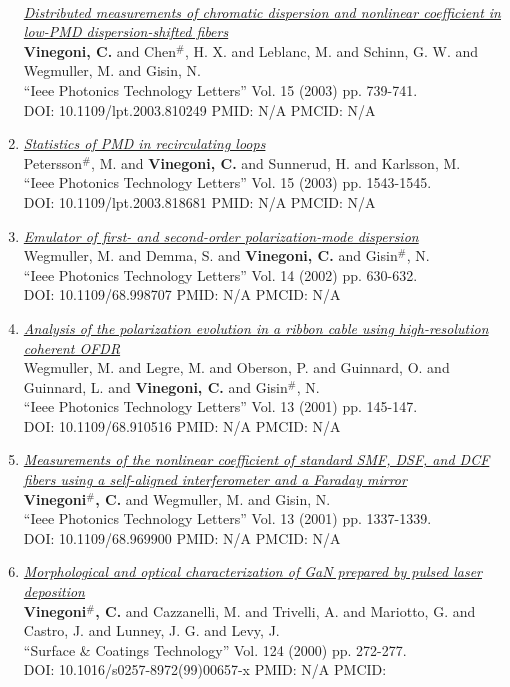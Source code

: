 \documentclass{resume}
\begin{document}
\begin{category}{~~}
\begin{enumerate}
\href{https://cvinegoni.github.io/assets/pdf/papers/2003-PTL-2.pdf}{\it  Distributed measurements of chromatic dispersion and nonlinear coefficient in low-PMD dispersion-shifted fibers} \\ {\bf Vinegoni, C.} and Chen$^\#$, H. X. and Leblanc, M. and Schinn, G. W. and Wegmuller, M. and Gisin, N. \\ ``Ieee Photonics Technology Letters'' Vol. 15 (2003) pp. 739-741. \\ DOI: 10.1109/lpt.2003.810249 PMID: N/A PMCID: N/A\item \href{https://cvinegoni.github.io/assets/pdf/papers/2003-PTL-1.pdf}{\it  Statistics of PMD in recirculating loops} \\ Petersson$^\#$, M. and {\bf Vinegoni, C.} and Sunnerud, H. and Karlsson, M. \\ ``Ieee Photonics Technology Letters'' Vol. 15 (2003) pp. 1543-1545. \\ DOI: 10.1109/lpt.2003.818681 PMID: N/A PMCID: N/A\item \href{https://cvinegoni.github.io/assets/pdf/papers/2002-PTL.pdf}{\it  Emulator of first- and second-order polarization-mode dispersion} \\ Wegmuller, M. and Demma, S. and {\bf Vinegoni, C.} and Gisin$^\#$, N. \\ ``Ieee Photonics Technology Letters'' Vol. 14 (2002) pp. 630-632. \\ DOI: 10.1109/68.998707 PMID: N/A PMCID: N/A\item \href{https://cvinegoni.github.io/assets/pdf/papers/2001-PTL-2.pdf}{\it  Analysis of the polarization evolution in a ribbon cable using high-resolution coherent OFDR} \\ Wegmuller, M. and Legre, M. and Oberson, P. and Guinnard, O. and Guinnard, L. and {\bf Vinegoni, C.} and Gisin$^\#$, N. \\ ``Ieee Photonics Technology Letters'' Vol. 13 (2001) pp. 145-147. \\ DOI: 10.1109/68.910516 PMID: N/A PMCID: N/A\item \href{https://cvinegoni.github.io/assets/pdf/papers/2001-PTL-1.pdf}{\it  Measurements of the nonlinear coefficient of standard SMF, DSF, and DCF fibers using a self-aligned interferometer and a Faraday mirror} \\ {\bf Vinegoni$^\#$, C.} and Wegmuller, M. and Gisin, N. \\ ``Ieee Photonics Technology Letters'' Vol. 13 (2001) pp. 1337-1339. \\ DOI: 10.1109/68.969900 PMID: N/A PMCID: N/A\item \href{https://cvinegoni.github.io/assets/pdf/papers/2000-SCT.pdf}{\it  Morphological and optical characterization of GaN prepared by pulsed laser deposition} \\ {\bf Vinegoni$^\#$, C.} and Cazzanelli, M. and Trivelli, A. and Mariotto, G. and Castro, J. and Lunney, J. G. and Levy, J. \\ ``Surface \& Coatings Technology'' Vol. 124 (2000) pp. 272-277. \\ DOI: 10.1016/s0257-8972(99)00657-x PMID: N/A PMCID: 
\end{enumerate}
\end{category}
\end{document}
